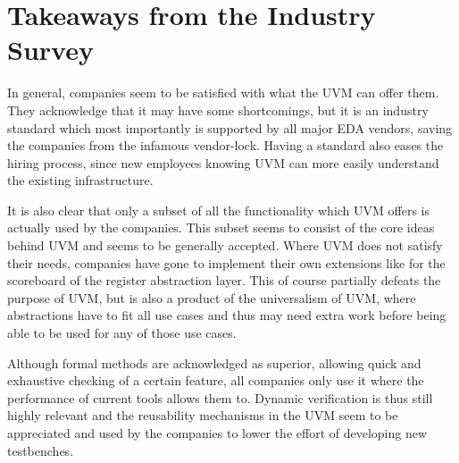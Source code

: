 \documentclass[11pt,a4paper]{report}
\begin{document}

\section{Takeaways from the Industry Survey} %

In general, companies seem to be satisfied with what the UVM can offer them. They acknowledge that it may have some
shortcomings, but it is an industry standard which most importantly is supported by all major EDA vendors, saving the
companies from the infamous vendor-lock. Having a standard also eases the hiring process, since new employees knowing
UVM can more easily understand the existing infrastructure.

It is also clear that only a subset of all the functionality which UVM offers is actually used by the companies. This
subset seems to consist of the core ideas behind UVM and seems to be generally accepted. Where UVM does not satisfy
their needs, companies have gone to implement their own extensions like for the scoreboard of the register
abstraction layer. This of course partially defeats the purpose of UVM, but is also a product of the universalism of
UVM, where abstractions have to fit all use cases and thus may need extra work before being able to be used for any
of those use cases.

Although formal methods are acknowledged as superior, allowing quick and exhaustive checking of a certain feature,
all companies only use it where the performance of current tools allows them to. Dynamic verification is thus still
highly relevant and the reusability mechanisms in the UVM seem to be appreciated and used by the companies to lower
the effort of developing new testbenches.
\end{document}
